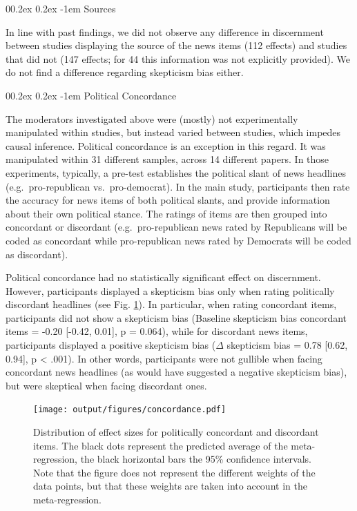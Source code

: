 \documentclass[
  doc,floatsintext]{apa6}
\makeatletter
\let\oldparagraph\paragraph
\renewcommand{\paragraph}[1]{\oldparagraph{#1}\mbox{}}
\renewcommand{\paragraph}{\@startsection{paragraph}{4}{\parindent}%
  {0\baselineskip \@plus 0.2ex \@minus 0.2ex}%
  {-1em}%
  {\normalfont\normalsize\bfseries\itshape\typesectitle}}
\makeatother
\begin{document}
\paragraph{Sources}\label{sources}

In line with past findings, we did not observe any difference in discernment between studies displaying the source of the news items (112 effects) and studies that did not (147 effects; for 44 this information was not explicitly provided). We do not find a difference regarding skepticism bias either.

\paragraph{Political Concordance}\label{political-concordance}

The moderators investigated above were (mostly) not experimentally manipulated within studies, but instead varied between studies, which impedes causal inference. Political concordance is an exception in this regard. It was manipulated within 31 different samples, across 14 different papers. In those experiments, typically, a pre-test establishes the political slant of news headlines (e.g.~pro-republican vs.~pro-democrat). In the main study, participants then rate the accuracy for news items of both political slants, and provide information about their own political stance. The ratings of items are then grouped into concordant or discordant (e.g.~pro-republican news rated by Republicans will be coded as concordant while pro-republican news rated by Democrats will be coded as discordant).

Political concordance had no statistically significant effect on discernment. However, participants displayed a skepticism bias only when rating politically discordant headlines (see Fig. \ref{fig:concordance}). In particular, when rating concordant items, participants did not show a skepticism bias (Baseline skepticism bias concordant items = -0.20 {[}-0.42, 0.01{]}, p = 0.064), while for discordant news items, participants displayed a positive skepticism bias (\(\Delta\) skepticism bias = 0.78 {[}0.62, 0.94{]}, p \textless{} .001). In other words, participants were not gullible when facing concordant news headlines (as would have suggested a negative skepticism bias), but were skeptical when facing discordant ones.



\begin{figure}
\centering
\texttt{[image: output/figures/concordance.pdf]}
\caption{\label{fig:concordance}Distribution of effect sizes for politically concordant and discordant items. The black dots represent the predicted average of the meta-regression, the black horizontal bars the 95\% confidence intervals. Note that the figure does not represent the different weights of the data points, but that these weights are taken into account in the meta-regression.}
\end{figure}
\end{document}
